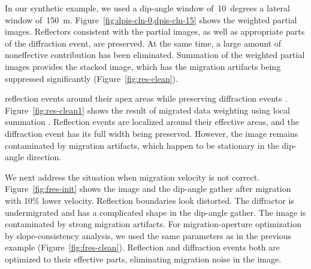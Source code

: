 In our synthetic example, we used a dip-angle window of~10~degrees\new{,} a lateral window of~150~m. Figure~\ref{fig:dpis-cln-0,dpis-cln-15} shows the weighted
partial images. Reflectors consistent with the partial images, as well as appropriate parts of the diffraction event, are preserved. 
At the same time, a large amount of noneffective contribution has been eliminated. 
Summation of the weighted partial images provides the stacked image, which has the migration artifacts being suppressed significantly
(Figure~\ref{fig:res-clean}).


 reflection events around their apex areas while preserving diffraction events . 
Figure~\ref{fig:res-clean1} shows the result of migrated data weighting using local summation .
Reflection events are localized around their effective areas, and the diffraction event has its full width being preserved. However,
the image remains contaminated by migration artifacts, which happen to be stationary in the dip-angle direction.

We next address the situation when migration velocity is not correct. Figure~\ref{fig:fres-init} shows the image and the dip-angle 
gather after migration with 10\% lower velocity. Reflection boundaries look distorted. The diffractor is undermigrated and has a complicated
shape in the dip-angle gather. The image is contaminated by strong migration artifacts. For migration-aperture optimization by
slope-consistency analysis, we used the same parameters as in the previous example (Figure~\ref{fig:fres-clean}).
Reflection and diffraction events both are optimized to their effective parts, eliminating migration noise in the image.

